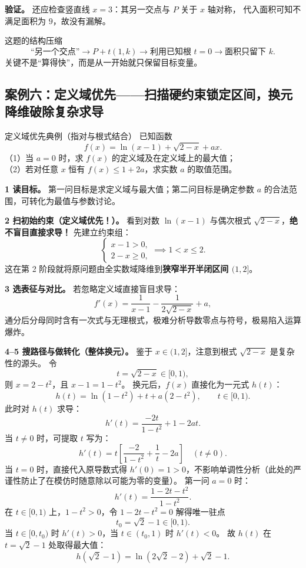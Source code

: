 \documentclass[11pt,a4paper]{ctexart}
\begin{document}
\textbf{验证。}
还应检查竖直线 $x=3$：其另一交点与 $P$ 关于 $x$ 轴对称，
代入面积可知不满足面积为 $9$，故没有漏解。

\begin{trainingbox}{这题的结构压缩}
\[
\text{“另一个交点”}
\rightarrow
P+t(1,k)
\rightarrow
\text{利用已知根 }t=0
\rightarrow
\text{面积只留下 }k.
\]
关键不是“算得快”，而是从一开始就只保留目标变量。
\end{trainingbox}

\subsection{案例六：定义域优先——扫描硬约束锁定区间，换元降维破除复杂求导}

\begin{examplebox}{定义域优先典例（指对与根式结合）}
已知函数
\[
f(x) = \ln(x-1) + \sqrt{2-x} + ax.
\]
（1）当 $a=0$ 时，求 $f(x)$ 的定义域及在定义域上的最大值；\\
（2）若对任意 $x$ 恒有 $f(x) \le 1 + 2a$，求实数 $a$ 的取值范围。
\end{examplebox}

\textbf{1 读目标。}
第一问目标是求定义域与最大值；第二问目标是确定参数 $a$ 的合法范围，可转化为最值与参数讨论。

\textbf{2 扫初始约束（定义域优先！）。}
看到对数 $\ln(x-1)$ 与偶次根式 $\sqrt{2-x}$，\textbf{绝不盲目直接求导！}
先建立约束组：
\[
\begin{cases}
x - 1 > 0,\\
2 - x \ge 0,
\end{cases}
\implies
\boxed{1 < x \le 2}.
\]
这在第 2 阶段就将原问题由全实数域降维到\textbf{狭窄半开半闭区间 $(1,2]$}。

\textbf{3 选表征与对比。}
若忽略定义域直接盲目求导：
\[
f'(x) = \frac{1}{x-1} - \frac{1}{2\sqrt{2-x}} + a,
\]
通分后分母同时含有一次式与无理根式，极难分析导数零点与符号，极易陷入运算爆炸。

\textbf{4--5 搜路径与做转化（整体换元）。}
鉴于 $x \in (1, 2]$，注意到根式 $\sqrt{2-x}$ 是复杂性的源头。
令
\[
t = \sqrt{2-x} \in [0, 1),
\]
则 $x = 2 - t^2$，且 $x - 1 = 1 - t^2$。
换元后，$f(x)$ 直接化为一元式 $h(t)$：
\[
h(t) = \ln(1-t^2) + t + a(2-t^2), \qquad t \in [0, 1).
\]
此时对 $h(t)$ 求导：
\[
h'(t) = \frac{-2t}{1-t^2} + 1 - 2at.
\]
当 $t \neq 0$ 时，可提取 $t$ 写为：
\[
h'(t) = t \left[ \frac{-2}{1-t^2} + \frac{1}{t} - 2a \right] \quad (t \neq 0).
\]
当 $t=0$ 时，直接代入原导数式得 $h'(0) = 1 > 0$，不影响单调性分析（此处的严谨性防止了在模仿时随意除以可能为零的变量）。
第一问 $a=0$ 时：
\[
h'(t) = \frac{1 - 2t - t^2}{1-t^2}.
\]
在 $t \in [0, 1)$ 上，$1-t^2 > 0$，令 $1 - 2t - t^2 = 0$ 解得唯一驻点
\[
t_0 = \sqrt{2} - 1 \in [0, 1).
\]
当 $t \in [0, t_0)$ 时 $h'(t) > 0$，当 $t \in (t_0, 1)$ 时 $h'(t) < 0$。
故 $h(t)$ 在 $t = \sqrt{2}-1$ 处取得最大值：
\[
h(\sqrt{2}-1) = \ln(2\sqrt{2}-2) + \sqrt{2}-1.
\]
\end{document}
